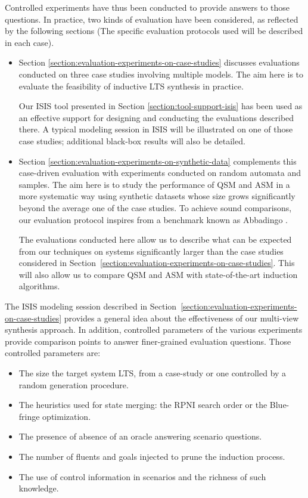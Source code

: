 Controlled experiments have thus been conducted to provide answers to those questions. In practice, two kinds of evaluation have been considered, as reflected by the following sections (The specific evaluation protocols used will be described in each case).
\begin{itemize}

\item Section \ref{section:evaluation-experiments-on-case-studies} discusses evaluations conducted on three case studies involving multiple models. The aim here is to evaluate the feasibility of inductive LTS synthesis in practice. 

Our ISIS tool presented in Section \ref{section:tool-support-isis} has been used as an effective support for designing and conducting the evaluations described there. A typical modeling session in ISIS will be illustrated on one of those case studies; additional black-box results will also be detailed.

\item Section \ref{section:evaluation-experiments-on-synthetic-data} complements this case-driven evaluation with experiments conducted on random automata and samples. The aim here is to study the performance of QSM and ASM in a more systematic way using synthetic datasets whose size grows significantly beyond the average one of the case studies. To achieve sound comparisons, our evaluation protocol inspires from a benchmark known as Abbadingo \cite{Lang:1998}.

The evaluations conducted here allow us to describe what can be expected from our techniques on systems significantly larger than the case studies considered in Section~\ref{section:evaluation-experiments-on-case-studies}. This will also allow us to compare QSM and ASM with state-of-the-art induction algorithms. 
\end{itemize}

The ISIS modeling session described in Section~\ref{section:evaluation-experiments-on-case-studies} provides a general idea about the effectiveness of our multi-view synthesis approach. In addition, controlled parameters of the various experiments provide comparison points to answer finer-grained evaluation questions. Those controlled parameters are:
\begin{itemize}
\item The size the target system LTS, from a case-study or one controlled by a random generation procedure.
\item The heuristics used for state merging: the RPNI search order or the Blue-fringe optimization.
\item The presence of absence of an oracle answering scenario questions.
\item The number of fluents and goals injected to prune the induction process.
\item The use of control information in scenarios and the richness of such knowledge.
\end{itemize}

